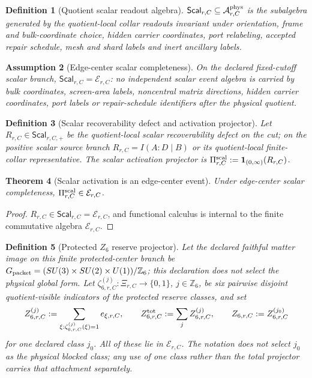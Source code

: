 \documentclass[11pt]{article}
\newtheorem{theorem}{Theorem}[section]
\newtheorem{definition}[theorem]{Definition}
\newtheorem{assumption}[theorem]{Assumption}
\theoremstyle{remark}
\theoremstyle{plain}
\begin{document}
\begin{definition}[Quotient scalar readout algebra]
\label{def:quotient-scalar-readout-algebra}
\(\mathsf{Scal}_{r,C}\subseteq\mathcal A^{\rm phys}_{r,C}\) is the subalgebra
generated by the quotient-local collar readouts invariant under orientation,
frame and bulk-coordinate choice, hidden carrier coordinates, port
relabeling, accepted repair schedule, mesh and shard labels and inert
ancillary labels.
\end{definition}

\begin{assumption}[Edge-center scalar completeness]
\label{ass:edge-center-scalar-completeness}
On the declared fixed-cutoff scalar branch,
\(\mathsf{Scal}_{r,C}=\mathcal E_{r,C}\): no independent scalar event algebra
is carried by bulk coordinates, screen-area labels, noncentral matrix
directions, hidden carrier coordinates, port labels or repair-schedule
identifiers after the physical quotient.
\end{assumption}

\begin{definition}[Scalar recoverability defect and activation projector]
\label{def:scalar-activation-projector}
Let \(R_{r,C}\in\mathsf{Scal}_{r,C,+}\) be the quotient-local scalar
recoverability defect on the cut; on the positive scalar source branch
\(R_{r,C}=I(A:D\mid B)\) or its quotient-local finite-collar representative.
The scalar activation projector is
\(\Pi^{\rm scal}_{r,C}:=\mathbf 1_{(0,\infty)}(R_{r,C})\).
\end{definition}

\begin{theorem}[Scalar activation is an edge-center event]
\label{thm:scalar-activation-edge-center}
Under edge-center scalar completeness, \(\Pi^{\rm scal}_{r,C}\in\mathcal E_{r,C}\).
\end{theorem}

\begin{proof}
\(R_{r,C}\in\mathsf{Scal}_{r,C}=\mathcal E_{r,C}\), and functional calculus is
internal to the finite commutative algebra \(\mathcal E_{r,C}\).
\end{proof}

\begin{definition}[Protected \(Z_6\) reserve projector]
\label{def:z6-reserve-projector}
Let the declared faithful matter image on this finite protected-center
branch be \(G_{\rm packet}=(SU(3)\times SU(2)\times U(1))/\mathbb Z_6\); this
declaration does not select the physical global form. Let
\(\zeta^{(j)}_{6,r,C}:\Xi_{r,C}\to\{0,1\}\), \(j\in\mathbb Z_6\), be six
pairwise disjoint quotient-visible indicators of the protected reserve
classes, and set
\[
Z^{(j)}_{6,r,C}:=\sum_{\xi:\zeta^{(j)}_{6,r,C}(\xi)=1}e_{\xi,r,C},
\qquad
Z^{\rm tot}_{6,r,C}:=\sum_{j}Z^{(j)}_{6,r,C},
\qquad
Z_{6,r,C}:=Z^{(j_0)}_{6,r,C}
\]
for one declared class \(j_0\). All of these lie in \(\mathcal E_{r,C}\). The
notation does not select \(j_0\) as the physical blocked class; any use of
one class rather than the total projector carries that attachment
separately.
\end{definition}
\end{document}
